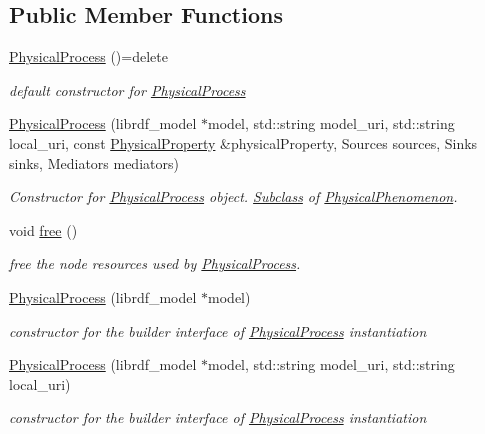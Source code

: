\subsection*{Public Member Functions}
\begin{DoxyCompactItemize}
\item 
\hyperlink{classomexmeta_1_1PhysicalProcess_acf4c42d10d6dbdd3aa4285bed7bd823b}{Physical\+Process} ()=delete
\begin{DoxyCompactList}\small\item\em default constructor for \hyperlink{classomexmeta_1_1PhysicalProcess}{Physical\+Process} \end{DoxyCompactList}\item 
\hyperlink{classomexmeta_1_1PhysicalProcess_a37f99033da4635ff1af2b9f19c1b84ce}{Physical\+Process} (librdf\+\_\+model $\ast$model, std\+::string model\+\_\+uri, std\+::string local\+\_\+uri, const \hyperlink{classomexmeta_1_1PhysicalProperty}{Physical\+Property} \&physical\+Property, Sources sources, Sinks sinks, Mediators mediators)
\begin{DoxyCompactList}\small\item\em Constructor for \hyperlink{classomexmeta_1_1PhysicalProcess}{Physical\+Process} object. \hyperlink{classSubclass}{Subclass} of \hyperlink{classomexmeta_1_1PhysicalPhenomenon}{Physical\+Phenomenon}. \end{DoxyCompactList}\item 
void \hyperlink{classomexmeta_1_1PhysicalProcess_a8dfcffe80f264ad24e70de9d7b71c73b}{free} ()
\begin{DoxyCompactList}\small\item\em free the node resources used by \hyperlink{classomexmeta_1_1PhysicalProcess}{Physical\+Process}. \end{DoxyCompactList}\item 
\hyperlink{classomexmeta_1_1PhysicalProcess_a2b694395a318335e81c884ed76b5f4dd}{Physical\+Process} (librdf\+\_\+model $\ast$model)
\begin{DoxyCompactList}\small\item\em constructor for the builder interface of \hyperlink{classomexmeta_1_1PhysicalProcess}{Physical\+Process} instantiation \end{DoxyCompactList}\item 
\hyperlink{classomexmeta_1_1PhysicalProcess_a974e2717dbf4b690b95b07e9c026fd2a}{Physical\+Process} (librdf\+\_\+model $\ast$model, std\+::string model\+\_\+uri, std\+::string local\+\_\+uri)
\begin{DoxyCompactList}\small\item\em constructor for the builder interface of \hyperlink{classomexmeta_1_1PhysicalProcess}{Physical\+Process} instantiation \end{DoxyCompactList}\item 

\end{DoxyCompactItemize}

